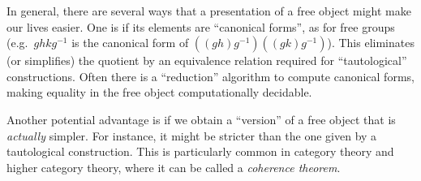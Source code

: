 \documentclass[12pt]{article}
\numberwithin{equation}{section}
\begin{document}
In general, there are several ways that a presentation of a free object might make our lives easier.
One is if its elements are ``canonical forms'', as for free groups (e.g.\ $g h k g^{-1}$ is the canonical form of $((g h) g^{-1})((g k) g^{-1})$).
This eliminates (or simplifies) the quotient by an equivalence relation required for ``tautological'' constructions.
Often there is a ``reduction'' algorithm to compute canonical forms, making equality in the free object computationally decidable.

Another potential advantage is if we obtain a ``version'' of a free object that is \emph{actually} simpler.
For instance, it might be stricter than the one given by a tautological construction.
This is particularly common in category theory and higher category theory, where it can be called a \emph{coherence theorem}.


\end{document}
